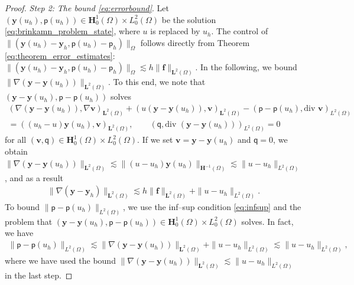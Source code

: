 \documentclass[final]{siamart0216}
\begin{document}
\begin{proof}
\emph{Step 2:} \emph{The bound \eqref{eq:errorbound}}. Let $(\mathbf{y}(u_{h}),\mathsf{p}(u_{h}))\in\mathbf{H}_0^1(\Omega)\times L_0^2(\Omega)$ be the solution \eqref{eq:brinkamn_problem_state}, where $u$ is replaced by $u_{h}$. The control of $\| (\mathbf{y}(u_{h})-\mathbf{y}_{h}, \mathsf{p}(u_h)-\mathsf{p}_h) \|_{\Omega}$ follows directly from Theorem \ref{eq:theorem_error_estimates}:
$
\| (\mathbf{y}(u_{h})-\mathbf{y}_{h}, \mathsf{p}(u_h)-\mathsf{p}_h ) \|_{\Omega} \lesssim h\|\mathbf{f}\|_{\mathbf{L}^2(\Omega)}.
$
In the following, we bound $\|\nabla(\mathbf{y}-\mathbf{y}(u_{h}))\|_{\mathbf{L}^2(\Omega)}$. To this end, we note that $(\mathbf{y}-\mathbf{y}(u_h),\mathsf{p}-\mathsf{p}(u_h))$
solves
\begin{multline*}
(\nabla (\mathbf{y}-\mathbf{y}(u_{h})),\nabla \mathbf{v})_{\mathbf{L}^2(\Omega)}+( u(\mathbf{y}-\mathbf{y}(u_{h})), \mathbf{v})_{\mathbf{L}^2(\Omega)}-(\mathsf{p}-\mathsf{p}(u_{h}),\text{div }\mathbf{v})_{L^2(\Omega)} \\=((u_{h}-u)\mathbf{y}(u_{h}),\mathbf{v})_{\mathbf{L}^2(\Omega)},
\qquad 
(\mathsf{q},\text{div }(\mathbf{y}-\mathbf{y}(u_{h})))_{L^2(\Omega)}  =  0
\end{multline*}
for all $(\mathbf{v},\mathsf{q}) \in \mathbf{H}_0^1(\Omega) \times L_0^2(\Omega)$. If we set $\mathbf{v} = \mathbf{y}-\mathbf{y}(u_{h})$ and $\mathsf{q}=0$, we obtain $\|\nabla(\mathbf{y}-\mathbf{y}(u_{h}))\|_{\mathbf{L}^2(\Omega)}\lesssim \|(u-u_{h})\mathbf{y}(u_{h})\|_{\mathbf{H}^{-1}(\Omega)} \lesssim \|u-u_{h}\|_{L^{2}(\Omega)}$, and as a result
\begin{align}\label{eq:error_aux_est02}
\|\nabla(\mathbf{y}-\mathbf{y}_{h})\|_{\mathbf{L}^2(\Omega)}\lesssim h \|\mathbf{f}\|_{\mathbf{L}^2(\Omega)}+\|u-u_{h}\|_{L^2(\Omega)}.
\end{align}
To bound $\|\mathsf{p}-\mathsf{p}(u_h)\|_{L^2(\Omega)}$, we use the inf--sup condition \eqref{eq:infsup} and the problem that $(\mathbf{y}-\mathbf{y}(u_h),\mathsf{p}-\mathsf{p}(u_h))\in\mathbf{H}_0^1(\Omega)\times L_0^2(\Omega)$ solves. In fact, we have
\begin{align}\label{eq:error_aux_est03}
\|\mathsf{p}-\mathsf{p}(u_h)\|_{L^2(\Omega)}\lesssim \|\nabla(\mathbf{y}-\mathbf{y}(u_h))\|_{\mathbf{L}^2(\Omega)}+\|u-u_h\|_{L^2(\Omega)}
\lesssim
\|u-u_{h}\|_{L^2(\Omega)},
\end{align}
where we have used the bound $\|\nabla(\mathbf{y}-\mathbf{y}(u_{h}))\|_{\mathbf{L}^2(\Omega)} \lesssim \|u-u_{h}\|_{L^{2}(\Omega)}$ in the last step.
\end{proof}
\end{document}
